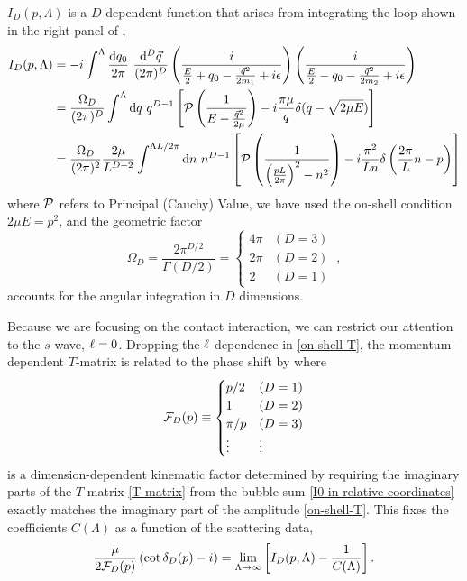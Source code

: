 $I_D(p,\Lambda)$ is a $D$-dependent function that arises from integrating the loop shown in the right panel of ,
\begin{align}
    I_D(p, \Lambda)
    &=-i\int^{\Lambda}
        \frac { \mathrm {d}q_0}{2\pi}\ \frac{\mathrm { d } ^ { D } \vec{ q } } { (2\pi)^ { D } }
        \left( \frac { i } { \frac{E}{2} + q _ { 0 } - \frac{\vec{q}^2}{2m_1} + i \epsilon } \right)
        \left( \frac { i } { \frac{E}{2} - q _ { 0 } - \frac{\vec{q}^2}{2m_2} + i \epsilon } \right)
    \label{eq:I0 in two particle language}\\
    &=\frac{\Omega_D}{(2\pi)^D}\int^{\Lambda}  \mathrm { d } q \ q^{D-1}\left[\PV \left( \frac { 1 } { E - \frac{\vec{q}^2}{2\mu} } \right)
-i\frac{\pi \mu}{q}\delta(q-\sqrt{2 \mu E})\right]
    \label{eq:I0 in relative coordinates}
    \\
    &=\frac{\Omega_D}{(2\pi)^2}\frac{2\mu}{L^{D-2}}\int^{\Lambda L/2\pi}  \mathrm { d } n \ n^{D-1}\left[\PV \left( \frac { 1 } { \left(\frac{pL}{2\pi}\right)^2 - n^2 } \right)
-i\frac{\pi^2}{L n}\delta\left(\frac{2\pi}{L}n -p\right)\right]
    \label{eq:I0}
\end{align}
where $\mathcal{P}$ refers to Principal (Cauchy) Value, we have used the on-shell condition $2\mu E=p^2$, and the geometric factor
\begin{equation}
\Omega_D=\frac{2\pi^{D/2}}{\Gamma(D/2)}=
    \begin{cases}
        4\pi    &   (D=3)\\
        2\pi    &   (D=2)\\
        2       &   (D=1)
    \end{cases}\ ,
\end{equation}
accounts for the angular integration in $D$ dimensions.

Because we are focusing on the contact interaction, we can restrict our attention to the $s$-wave, $\ell=0$.
Dropping the $\ell$ dependence in \eqref{on-shell-T}, the momentum-dependent $T$-matrix is related to the phase shift by where
\begin{equation}\label{eq:spherical FD}
    \mathcal{F}_{D}(p)
    \equiv
    \begin{cases}
        p/2     & (D=1)\\
        1       & (D=2)\\
        \pi/p   & (D=3)\\
        \vdots  & \vdots
\end{cases}
\end{equation}
is a dimension-dependent kinematic factor determined by requiring the imaginary parts of the $T$-matrix \eqref{T matrix} from the bubble sum \eqref{I0 in relative coordinates} exactly matches the imaginary part of the amplitude \eqref{on-shell-T}.
This fixes the coefficients $C(\Lambda)$ as a function of the scattering data,
\begin{equation}\label{eq:IV pole}
    \frac{\mu}{2 \mathcal{F}_{D}(p)}\left(\cot \delta_{D}(p) - i\right)
    =
    \lim\limits_{\Lambda \to \infty} \left[ I_D(p, \Lambda) - \frac{1}{C(\Lambda)} \right].
\end{equation}

